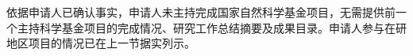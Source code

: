 \justifying
\NSFCBodyText

依据申请人已确认事实，申请人未主持完成国家自然科学基金项目，无需提供前一个主持科学基金项目的完成情况、研究工作总结摘要及成果目录。申请人参与在研地区项目的情况已在上一节据实列示。
